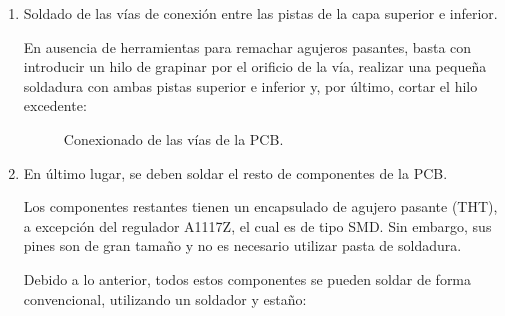 \begin{enumerate}
    \item Soldado de las vías de conexión entre las pistas de la capa superior e inferior.
    
    En ausencia de herramientas para remachar agujeros pasantes, basta con introducir un hilo de grapinar por el orificio de la vía, realizar una pequeña soldadura con ambas pistas superior e inferior y, por último, cortar el hilo excedente:
    

    \begin{figure}[H]
    \centering
    \caption{Conexionado de las vías de la \ac{PCB}.}
    \end{figure}
    
    \item En último lugar, se deben soldar el resto de componentes de la \ac{PCB}.
    
    Los componentes restantes tienen un encapsulado de agujero pasante (\ac{THT}), a excepción del regulador A1117Z, el cual es de tipo \ac{SMD}. Sin embargo, sus pines son de gran tamaño y no es necesario utilizar pasta de soldadura.
    
    Debido a lo anterior, todos estos componentes se pueden soldar de forma convencional, utilizando un soldador y estaño:
    

\end{enumerate}
